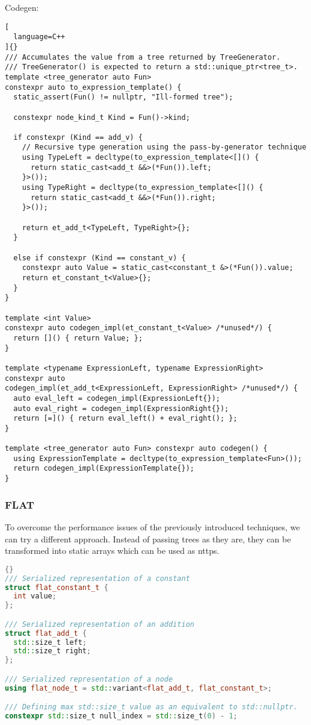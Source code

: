 \documentclass[../main]{subfiles}
\begin{document}
Codegen:

\begin{lstlisting}[
  language=C++
]{}
/// Accumulates the value from a tree returned by TreeGenerator.
/// TreeGenerator() is expected to return a std::unique_ptr<tree_t>.
template <tree_generator auto Fun>
constexpr auto to_expression_template() {
  static_assert(Fun() != nullptr, "Ill-formed tree");

  constexpr node_kind_t Kind = Fun()->kind;

  if constexpr (Kind == add_v) {
    // Recursive type generation using the pass-by-generator technique
    using TypeLeft = decltype(to_expression_template<[]() {
      return static_cast<add_t &&>(*Fun()).left;
    }>());
    using TypeRight = decltype(to_expression_template<[]() {
      return static_cast<add_t &&>(*Fun()).right;
    }>());

    return et_add_t<TypeLeft, TypeRight>{};
  }

  else if constexpr (Kind == constant_v) {
    constexpr auto Value = static_cast<constant_t &>(*Fun()).value;
    return et_constant_t<Value>{};
  }
}

template <int Value>
constexpr auto codegen_impl(et_constant_t<Value> /*unused*/) {
  return []() { return Value; };
}

template <typename ExpressionLeft, typename ExpressionRight>
constexpr auto
codegen_impl(et_add_t<ExpressionLeft, ExpressionRight> /*unused*/) {
  auto eval_left = codegen_impl(ExpressionLeft{});
  auto eval_right = codegen_impl(ExpressionRight{});
  return [=]() { return eval_left() + eval_right(); };
}

template <tree_generator auto Fun> constexpr auto codegen() {
  using ExpressionTemplate = decltype(to_expression_template<Fun>());
  return codegen_impl(ExpressionTemplate{});
}
\end{lstlisting}

\subsubsection{
  FLAT
}

\label{lbl:flat-technique}

To overcome the performance issues of the previously introduced techniques,
we can try a different approach. Instead of passing trees as they are,
they can be transformed into static arrays which can be used as \glspl{nttp}.

\begin{lstlisting}[language=C++, label=lst:flat_struct_def]{}
/// Serialized representation of a constant
struct flat_constant_t {
  int value;
};

/// Serialized representation of an addition
struct flat_add_t {
  std::size_t left;
  std::size_t right;
};

/// Serialized representation of a node
using flat_node_t = std::variant<flat_add_t, flat_constant_t>;

/// Defining max std::size_t value as an equivalent to std::nullptr.
constexpr std::size_t null_index = std::size_t(0) - 1;
\end{lstlisting}
\end{document}
